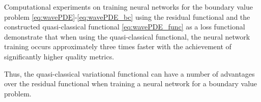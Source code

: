 \documentclass[12pt]{llncs}
\begin{document}
Computational experiments on training neural networks for the boundary value problem \eqref{eq:wavePDE}-\eqref{eq:wavePDE_bc} using the residual functional and the constructed quasi-classical functional \eqref{eq:wavePDE_func} as a loss functional demonstrate that when using the quasi-classical functional, the neural network training occurs approximately three times faster with the achievement of significantly higher quality metrics.

Thus, the quasi-classical variational functional can have a number of advantages over the residual functional when training a neural network for a boundary value problem.


%

\end{document}
